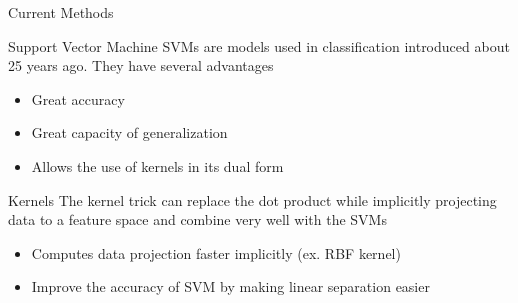 \documentclass[compress]{beamer}
\begin{document}
\begin{frame}{Current Methods}
\begin{block}{Support Vector Machine}
SVMs are models used in classification introduced about 25 years ago. They have several advantages
\begin{itemize}
	\item Great accuracy
	\item Great capacity of generalization
	\item Allows the use of kernels in its dual form
\end{itemize}
\end{block}

\begin{block}{Kernels}
	The kernel trick can replace the dot product while implicitly projecting data to a feature space and combine very well with the SVMs
\begin{itemize}
	\item Computes data projection faster implicitly (ex. RBF kernel)
	\item Improve the accuracy of SVM by making linear separation easier
\end{itemize}
\end{block}
\end{frame}
\end{document}
